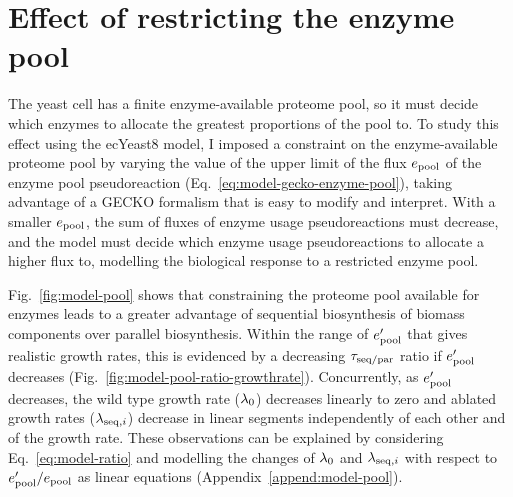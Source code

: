 \section{Effect of restricting the enzyme pool}
\label{sec:model-pool}

The yeast cell has a finite enzyme-available proteome pool, so it must decide which enzymes to allocate the greatest proportions of the pool to.
To study this effect using the ecYeast8 model, I imposed a constraint on the enzyme-available proteome pool by varying the value of the upper limit of the flux $e_{\mathrm{pool}}$ of the enzyme pool pseudoreaction (Eq.\ \ref{eq:model-gecko-enzyme-pool}), taking advantage of a GECKO formalism that is easy to modify and interpret.
With a smaller $e_{\mathrm{pool}}$, the sum of fluxes of enzyme usage pseudoreactions must decrease, and the model must decide which enzyme usage pseudoreactions to allocate a higher flux to, modelling the biological response to a restricted enzyme pool.

Fig.\ \ref{fig:model-pool} shows that constraining the proteome pool available for enzymes leads to a greater advantage of sequential biosynthesis of biomass components over parallel biosynthesis.
Within the range of $e_{\mathrm{pool}}^{\prime}$ that gives realistic growth rates, this is evidenced by a decreasing $\tau_{\mathrm{seq}/\mathrm{par}}$ ratio if $e_{\mathrm{pool}}^{\prime}$ decreases (Fig.\ \ref{fig:model-pool-ratio-growthrate}).
Concurrently, as $e_{\mathrm{pool}}^{\prime}$ decreases, the wild type growth rate ($\lambda_{0}$) decreases linearly to zero and ablated growth rates ($\lambda_{\mathrm{seq},i}$) decrease in linear segments independently of each other and of the growth rate.
These observations can be explained by considering Eq.\ \ref{eq:model-ratio} and modelling the changes of $\lambda_{0}$ and $\lambda_{\mathrm{seq},i}$ with respect to $e_{\mathrm{pool}}^{\prime}/e_{\mathrm{pool}}$ as linear equations (Appendix~\ref{append:model-pool}).


